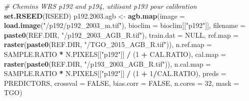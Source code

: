 \documentclass[a4paper, notitlepage, 12pt, krantz2]{krantz}
\newenvironment{Shaded}{\begin{snugshade}}{\end{snugshade}}
\newcommand{\CommentTok}[1]{\textcolor[rgb]{0.56,0.35,0.01}{\textit{#1}}}
\newcommand{\DataTypeTok}[1]{\textcolor[rgb]{0.13,0.29,0.53}{#1}}
\newcommand{\DecValTok}[1]{\textcolor[rgb]{0.00,0.00,0.81}{#1}}
\newcommand{\FloatTok}[1]{\textcolor[rgb]{0.00,0.00,0.81}{#1}}
\newcommand{\KeywordTok}[1]{\textcolor[rgb]{0.13,0.29,0.53}{\textbf{#1}}}
\newcommand{\NormalTok}[1]{#1}
\newcommand{\OperatorTok}[1]{\textcolor[rgb]{0.81,0.36,0.00}{\textbf{#1}}}
\newcommand{\OtherTok}[1]{\textcolor[rgb]{0.56,0.35,0.01}{#1}}
\newcommand{\StringTok}[1]{\textcolor[rgb]{0.31,0.60,0.02}{#1}}
\begin{document}
\begin{Shaded}
\begin{Highlighting}[]
{{{{\CommentTok{# Chemins WRS p192 and p194, utilisant p193 pour calibration}
\KeywordTok{set.RSEED}\NormalTok{(RSEED)}
\NormalTok{p192.}\FloatTok{2003.}\NormalTok{agb <-}\StringTok{ }\KeywordTok{agb.map}\NormalTok{(}\DataTypeTok{image     =} \KeywordTok{load.image}\NormalTok{(}\StringTok{"/p192/p192_2003_m.tif"}\NormalTok{), }
                         \DataTypeTok{bioclim   =}\NormalTok{ bioclim[[}\StringTok{"p192"}\NormalTok{]],}
                         \DataTypeTok{filename  =} \KeywordTok{paste0}\NormalTok{(REF.DIR, }\StringTok{"/p192_2003_AGB_R.tif"}\NormalTok{),}
                         \DataTypeTok{train.dat =} \OtherTok{NULL}\NormalTok{,}
                         \DataTypeTok{ref.map   =} \KeywordTok{raster}\NormalTok{(}\KeywordTok{paste0}\NormalTok{(REF.DIR, }\StringTok{"/TGO_2015_AGB_R.tif"}\NormalTok{)),}
                         \DataTypeTok{n.ref.map =}\NormalTok{ SAMPLE.RATIO }\OperatorTok{*}\StringTok{ }\NormalTok{N.PIXELS[[}\StringTok{"p192"}\NormalTok{]] }\OperatorTok{/}\StringTok{ }\NormalTok{(}\DecValTok{1} \OperatorTok{+}\StringTok{ }\NormalTok{CAL.RATIO),}
                         \DataTypeTok{cal.map   =} \KeywordTok{raster}\NormalTok{(}\KeywordTok{paste0}\NormalTok{(REF.DIR, }\StringTok{"/p193_2003_AGB_R.tif"}\NormalTok{)),}
                         \DataTypeTok{n.cal.map =}\NormalTok{ SAMPLE.RATIO }\OperatorTok{*}\StringTok{ }\NormalTok{N.PIXELS[[}\StringTok{"p192"}\NormalTok{]] }\OperatorTok{/}\StringTok{ }\NormalTok{(}\DecValTok{1} \OperatorTok{+}\StringTok{ }\DecValTok{1}\OperatorTok{/}\NormalTok{CAL.RATIO),}
                         \DataTypeTok{preds     =}\NormalTok{ PREDICTORS,}
                         \DataTypeTok{crossval  =} \OtherTok{FALSE}\NormalTok{,}
                         \DataTypeTok{bias.corr =} \OtherTok{FALSE}\NormalTok{,}
                         \DataTypeTok{n.cores   =} \DecValTok{32}\NormalTok{,}
                         \DataTypeTok{mask      =}\NormalTok{ TGO)}

}}}}
\end{Highlighting}
\end{Shaded}
\end{document}
